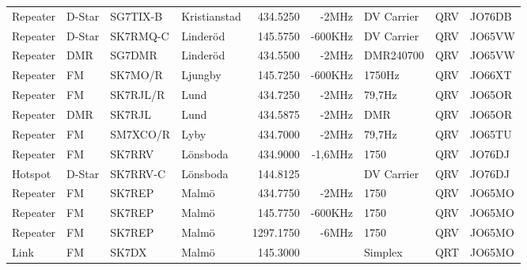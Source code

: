 \begin{landscape}
\begin{longtable}{llllrrlcl}
	Repeater          & D-Star       & SG7TIX-B      & Kristianstad        &          434.5250 &          -2MHz & DV Carrier      &       QRV       & JO76DB           \\
	Repeater          & D-Star       & SK7RMQ-C      & Linderöd            &          145.5750 &        -600KHz & DV Carrier      &       QRV       & JO65VW           \\
	Repeater          & DMR          & SG7DMR        & Linderöd            &          434.5500 &          -2MHz & DMR240700       &       QRV       & JO65VW           \\
	Repeater          & FM           & SK7MO/R       & Ljungby             &          145.7250 &        -600KHz & 1750Hz          &       QRV       & JO66XT           \\
	Repeater          & FM           & SK7RJL/R      & Lund                &          434.7250 &          -2MHz & 79,7Hz          &       QRV       & JO65OR           \\
	Repeater          & DMR          & SK7RJL        & Lund                &          434.5875 &          -2MHz & DMR             &       QRV       & JO65OR           \\
	Repeater          & FM           & SM7XCO/R      & Lyby                &          434.7000 &          -2MHz & 79,7Hz          &       QRV       & JO65TU           \\
	Repeater          & FM           & SK7RRV        & Lönsboda            &          434.9000 &        -1,6MHz & 1750            &       QRV       & JO76DJ           \\
	Hotspot           & D-Star       & SK7RRV-C      & Lönsboda            &          144.8125 &                & DV Carrier      &       QRV       & JO76DJ           \\
	Repeater          & FM           & SK7REP        & Malmö               &          434.7750 &          -2MHz & 1750            &       QRV       & JO65MO           \\
	Repeater          & FM           & SK7REP        & Malmö               &          145.7750 &        -600KHz & 1750            &       QRV       & JO65MO           \\
	Repeater          & FM           & SK7REP        & Malmö               &         1297.1750 &          -6MHz & 1750            &       QRV       & JO65MO           \\
	Link              & FM           & SK7DX         & Malmö               &          145.3000 &                & Simplex         &       QRT       & JO65MO           \\

\end{longtable}
\end{landscape}
